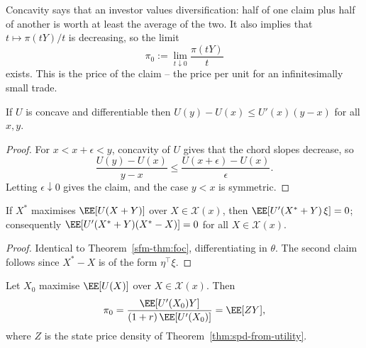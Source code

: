 Concavity says that an investor values diversification: half of one claim plus half of another is worth at least the average of the two. It also implies that $t \mapsto \pi(tY)/t$ is decreasing, so the limit
$$
\pi_0 := \lim_{t\downarrow 0}\frac{\pi(tY)}{t}
$$
exists. This is the  price of the claim -- the price per unit for an infinitesimally small trade.

\begin{lemma}\label{lem:supporting}
	If $U$ is concave and differentiable then $U(y) - U(x) \leq U'(x)(y-x)$ for all $x,y$.
\end{lemma}

\begin{proof}
	For $x < x + \epsilon < y$, concavity of $U$ gives that the chord slopes decrease, so
	$$
	\frac{U(y)-U(x)}{y-x} \leq \frac{U(x+\epsilon)-U(x)}{\epsilon}.
	$$
	Letting $\epsilon \downarrow 0$ gives the claim, and the case $y < x$ is symmetric.
\end{proof}

\begin{lemma}\label{lem:foc-with-claim}
	If $X^*$ maximises $\EE[U(X+Y)]$ over $X \in \mathcal{X}(x)$, then $\EE[U'(X^*+Y)\,\xi] = 0$; consequently $\EE[U'(X^*+Y)(X^* - X)] = 0$ for all $X \in \mathcal{X}(x)$.
\end{lemma}

\begin{proof}
	Identical to Theorem~\ref{sfm-thm:foc}, differentiating in $\theta$. The second claim follows since $X^* - X$ is of the form $\eta^\top\xi$.
\end{proof}

\begin{theorem}\label{thm:marginal}
	Let $X_0$ maximise $\EE[U(X)]$ over $X \in \mathcal{X}(x)$. Then
	$$
	\pi_0 = \frac{\EE[U'(X_0)Y]}{(1+r)\,\EE[U'(X_0)]} = \EE[ZY],
	$$
	where $Z$ is the state price density of Theorem~\ref{thm:spd-from-utility}.
\end{theorem}

